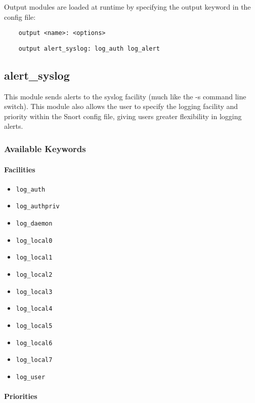 \documentclass[english]{report}
\begin{document}
Output modules are loaded at runtime by specifying the output keyword in the
config file:

\begin{verbatim}
    output <name>: <options>
\end{verbatim}

\begin{verbatim}
    output alert_syslog: log_auth log_alert
\end{verbatim}

\subsection{alert\_syslog}
\label{alert syslog label}

This module sends alerts to the syslog facility (much like the -s command line
switch). This module also allows the user to specify the logging facility and
priority within the Snort config file, giving users greater flexibility in
logging alerts.

\subsubsection{Available Keywords}

\paragraph{Facilities}

\begin{itemize}
\item \texttt{log\_auth} 
\item \texttt{log\_authpriv} 
\item \texttt{log\_daemon}
\item \texttt{log\_local0} 
\item \texttt{log\_local1}
\item \texttt{log\_local2}
\item \texttt{log\_local3}
\item \texttt{log\_local4}
\item \texttt{log\_local5}
\item \texttt{log\_local6}
\item \texttt{log\_local7}
\item \texttt{log\_user}
\end{itemize}

\paragraph{Priorities}
\end{document}
